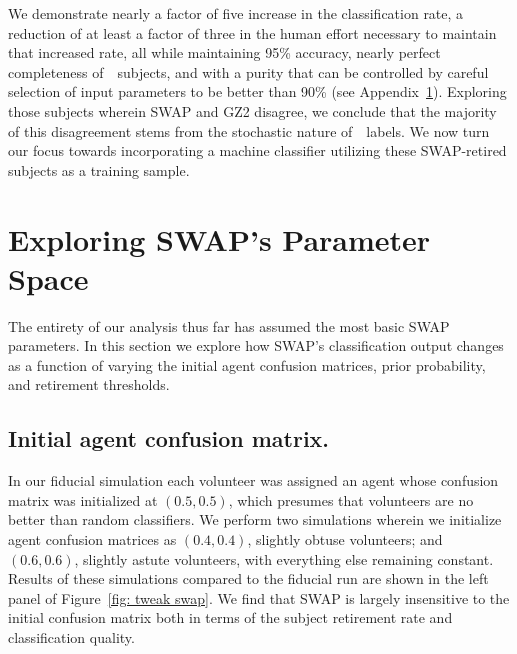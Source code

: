 We demonstrate nearly a factor of five increase in the classification rate, a reduction of at least a factor of three in the human effort necessary to maintain that increased rate, all while maintaining 95\% accuracy, nearly perfect completeness of~\feat~subjects, and with a purity that can be controlled by careful selection of input parameters to be better than 90\% (see Appendix~\ref{sec: tweaking swap}). Exploring those subjects wherein SWAP and GZ2 disagree, we conclude that the majority of this disagreement stems from the stochastic nature of~\raw~labels. We now turn our focus towards incorporating a machine classifier utilizing these SWAP-retired subjects as a training sample. 


\section{Exploring SWAP's Parameter Space} \label{sec: tweaking swap}

The entirety of our analysis thus far has assumed the most basic SWAP parameters. In this section we explore how SWAP's classification output changes as a function of varying the initial agent confusion matrices, prior probability, and retirement thresholds.


\subsection{Initial agent confusion matrix.} 
In our fiducial simulation each volunteer was assigned an agent whose confusion matrix was initialized at $(0.5, 0.5)$, which presumes that volunteers are no better than random classifiers. We perform two simulations wherein we initialize agent confusion matrices as $(0.4, 0.4)$, slightly obtuse volunteers; and $(0.6, 0.6)$, slightly astute volunteers, with everything else remaining constant.  Results of these simulations compared to the fiducial run are shown in the left panel of Figure~\ref{fig: tweak swap}. We find that SWAP is largely insensitive to the initial confusion matrix  both in terms of the subject retirement rate and classification quality.  

